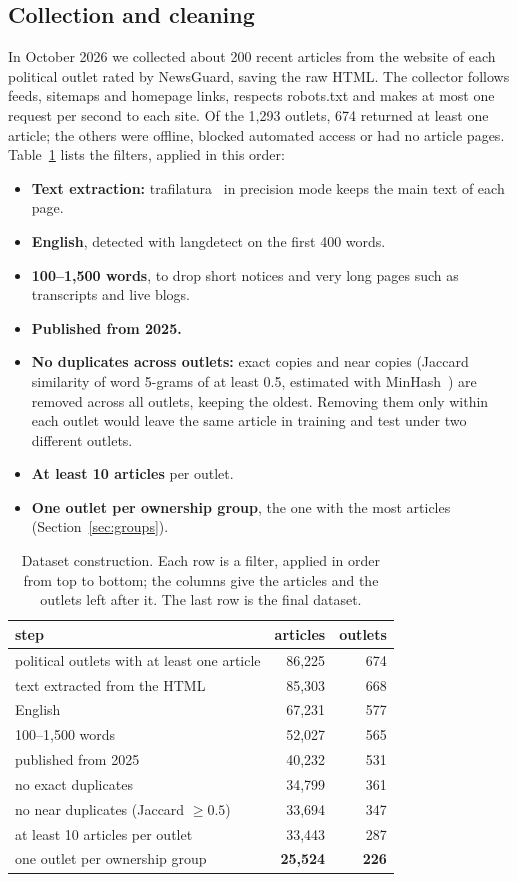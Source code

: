 \documentclass[11pt,a4paper]{article}
\begin{document}
\subsection{Collection and cleaning}\label{sec:cleaning}
In October 2026 we collected about 200 recent articles from the website of each political outlet rated by NewsGuard,
saving the raw HTML. The collector follows feeds, sitemaps and homepage links, respects robots.txt and makes at most one
request per second to each site. Of the 1,293 outlets, 674 returned at least one article; the others were offline,
blocked automated access or had no article pages. Table~\ref{tab:cleaning} lists the filters, applied in this order:
\begin{itemize}
  \item \textbf{Text extraction:} trafilatura~\cite{barbaresi2021trafilatura} in precision mode keeps the main text of
        each page.
  \item \textbf{English}, detected with langdetect on the first 400 words.
  \item \textbf{100--1,500 words}, to drop short notices and very long pages such as transcripts and live blogs.
  \item \textbf{Published from 2025.}
  \item \textbf{No duplicates across outlets:} exact copies and near copies (Jaccard similarity of word 5-grams of at
        least 0.5, estimated with MinHash~\cite{broder1997resemblance}) are removed across all outlets, keeping the
        oldest. Removing them only within each outlet would leave the same article in training and test under two
        different outlets.
  \item \textbf{At least 10 articles} per outlet.
  \item \textbf{One outlet per ownership group}, the one with the most articles (Section~\ref{sec:groups}).
\end{itemize}

\begin{table}[t]
\centering
\caption{Dataset construction. Each row is a filter, applied in order from top to bottom; the columns give the articles
and the outlets left after it. The last row is the final dataset.}\label{tab:cleaning}
\begin{tabular}{lrr}
\toprule
step & articles & outlets \\
\midrule
political outlets with at least one article & 86,225 & 674 \\
text extracted from the HTML & 85,303 & 668 \\
English & 67,231 & 577 \\
100--1,500 words & 52,027 & 565 \\
published from 2025 & 40,232 & 531 \\
no exact duplicates & 34,799 & 361 \\
no near duplicates (Jaccard $\geq 0.5$) & 33,694 & 347 \\
at least 10 articles per outlet & 33,443 & 287 \\
one outlet per ownership group & \textbf{25,524} & \textbf{226} \\
\bottomrule
\end{tabular}
\end{table}
\end{document}
